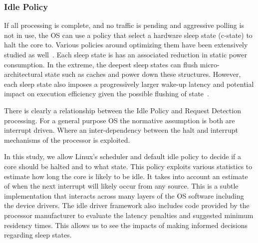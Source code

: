 
\subsubsection{Idle Policy}
\label{sec:workflow:idlepolicy}

If all processing is complete, and no traffic is pending and aggressive polling is not in use, the OS can use a policy that select a hardware sleep state (c-state) to halt the core to. Various policies around optimizing them have been extensively studied as well~\cite{dynsleep,dreamweaver,slowdownorsleep}. Each sleep state is has an associated reduction in static power consumption. In the extreme, the deepest sleep states can flush micro-architectural state such as caches and power down these structures. However, each sleep state also imposes a progressively larger wake-up latency and potential impact on execution efficiency given the possible flushing of state~\cite{7425206}. %


There is clearly a relationship between the Idle Policy and Request Detection processing.  For a general purpose OS the normative assumption is both are interrupt driven.  Where an inter-dependency between the halt and interrupt mechanisms of the processor is exploited.  

In this study, we allow Linux's scheduler and default idle policy to decide if a core should be halted and to what state.  This policy exploits various statistics to estimate how long the core is likely to be idle. It takes into account an estimate of when the next interrupt will likely occur from any source.  This is a subtle implementation that interacts across many layers of the OS software including the device drivers.  The idle driver framework also includes code provided by the processor manufacturer to evaluate the latency penalties and suggested minimum residency times.  This allows us to see the impacts of making informed decisions regarding sleep states.  

